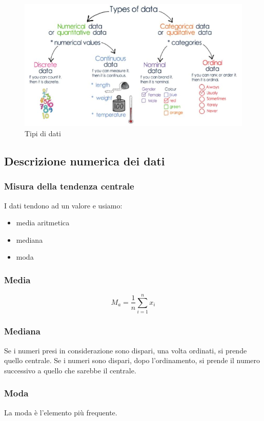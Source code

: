 \begin{figure}[H]
    \centering
    \includegraphics[width=0.7\linewidth]{imgs/1 - dati}
    \caption{Tipi di dati}
    \label{fig:tipi_di_dati}
\end{figure}

\subsection{Descrizione numerica dei dati}
\subsubsection{Misura della tendenza centrale}
I dati tendono ad un valore e usiamo:
\begin{itemize}
    \item media aritmetica
    \item mediana
    \item moda
\end{itemize}

\subsubsection{Media}
\begin{equation}
    M_a = \frac{1}{n}\sum_{i=1}^{n}x_i
    \label{eq:media}
\end{equation}
\subsubsection{Mediana}
Se i numeri presi in considerazione sono dispari, una volta ordinati, si prende quello centrale.
Se i numeri sono dispari, dopo l'ordinamento, si prende il numero successivo a quello che sarebbe il centrale.

\subsubsection{Moda}
La moda è l'elemento più frequente.

